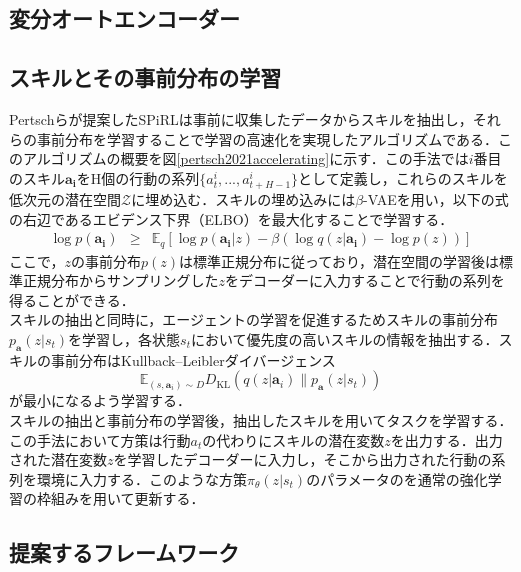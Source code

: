 \documentclass[dvipdfmx]{ampbt_nomag}
\begin{document}
\subsection{変分オートエンコーダー}


\subsection{スキルとその事前分布の学習}
Pertschらが提案したSPiRLは事前に収集したデータからスキルを抽出し，それらの事前分布を学習することで学習の高速化を実現したアルゴリズムである\cite{pertsch2021accelerating}．このアルゴリズムの概要を図\ref{pertsch2021accelerating}に示す．この手法では$i$番目のスキル$\boldsymbol{a_i}$をH個の行動の系列$\{a^i_t,...,a^i_{t+H-1}\}$として定義し，これらのスキルを低次元の潜在空間$\mathcal{Z}$に埋め込む．スキルの埋め込みには$\beta$-VAEを用い，以下の式の右辺であるエビデンス下界（ELBO）を最大化することで学習する．
\begin{eqnarray} 
\label{ELBO}
\log p(\boldsymbol{a_i}) &\geq& \mathbb{E}_q [\log p(\boldsymbol{a_i}|z)  -\beta(\log{q(z|\boldsymbol{a_i})} - \log{p(z)})]
\end{eqnarray}
ここで，$z$の事前分布$p(z)$は標準正規分布に従っており，潜在空間の学習後は標準正規分布からサンプリングした$z$をデコーダーに入力することで行動の系列を得ることができる．\\
スキルの抽出と同時に，エージェントの学習を促進するためスキルの事前分布$p_{\boldsymbol{a}}(z|s_t)$を学習し，各状態$s_t$において優先度の高いスキルの情報を抽出する．スキルの事前分布はKullback--Leiblerダイバージェンス
\begin{equation}
  \mathbb{E}_{(s,\boldsymbol{a}_i)\sim D}D_\mathrm{KL}\left(q(z|\boldsymbol{a}_i)\|p_{\boldsymbol{a}}(z|s_t)\right)
\end{equation}
が最小になるよう学習する．\\
スキルの抽出と事前分布の学習後，抽出したスキルを用いてタスクを学習する．この手法において方策は行動$a_t$の代わりにスキルの潜在変数$z$を出力する．出力された潜在変数$z$を学習したデコーダーに入力し，そこから出力された行動の系列を環境に入力する．このような方策$\pi_\theta(z|s_t)$のパラメータのを通常の強化学習の枠組みを用いて更新する．

\subsection{提案するフレームワーク}
\end{document}
